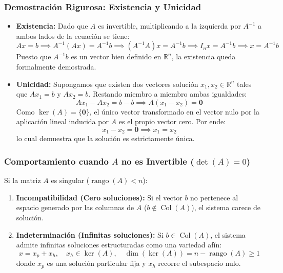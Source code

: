 \documentclass[11pt,a4paper]{article}
\theoremstyle{definition}
\theoremstyle{remark}
\begin{document}
\subsubsection{Demostración Rigurosa: Existencia y Unicidad}
\begin{itemize}[leftmargin=*]
    \item \textbf{Existencia:} Dado que $A$ es invertible, multiplicando a la izquierda por $A^{-1}$ a ambos lados de la ecuación se tiene:
    \begin{equation}
        Ax = b \implies A^{-1}(Ax) = A^{-1}b \implies (A^{-1}A)x = A^{-1}b \implies I_n x = A^{-1}b \implies x = A^{-1}b
    \end{equation}
    Puesto que $A^{-1}b$ es un vector bien definido en $\mathbb{R}^n$, la existencia queda formalmente demostrada.
    
    \item \textbf{Unicidad:} Supongamos que existen dos vectores solución $x_1, x_2 \in \mathbb{R}^n$ tales que $Ax_1 = b$ y $Ax_2 = b$. Restando miembro a miembro ambas igualdades:
    \begin{equation}
        Ax_1 - Ax_2 = b - b \implies A(x_1 - x_2) = \mathbf{0}
    \end{equation}
    Como $\ker(A) = \{\mathbf{0}\}$, el único vector transformado en el vector nulo por la aplicación lineal inducida por $A$ es el propio vector cero. Por ende:
    \begin{equation}
        x_1 - x_2 = \mathbf{0} \implies x_1 = x_2
    \end{equation}
    lo cual demuestra que la solución es estrictamente única.
\end{itemize}

\subsubsection{Comportamiento cuando $A$ no es Invertible ($\det(A) = 0$)}
Si la matriz $A$ es singular ($\operatorname{rango}(A) < n$):
\begin{enumerate}[leftmargin=*]
    \item \textbf{Incompatibilidad (Cero soluciones):} Si el vector $b$ no pertenece al espacio generado por las columnas de $A$ ($b \notin \operatorname{Col}(A)$), el sistema carece de solución.
    \item \textbf{Indeterminación (Infinitas soluciones):} Si $b \in \operatorname{Col}(A)$, el sistema admite infinitas soluciones estructuradas como una variedad afín:
    \begin{equation}
        x = x_p + x_h, \quad x_h \in \ker(A), \quad \dim(\ker(A)) = n - \operatorname{rango}(A) \ge 1
    \end{equation}
    donde $x_p$ es una solución particular fija y $x_h$ recorre el subespacio nulo.
\end{enumerate}
\end{document}
